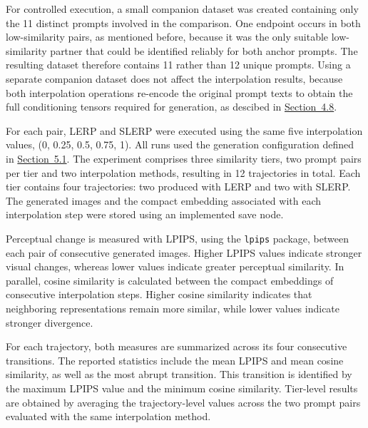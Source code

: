 For controlled execution, a small companion dataset was created containing only the 11 distinct prompts involved in the comparison. One endpoint occurs in both low-similarity pairs, as mentioned before, because it was the only suitable low-similarity partner that could be identified reliably for both anchor prompts. The resulting dataset therefore contains 11 rather than 12 unique prompts.
Using a separate companion dataset does not affect the interpolation results, because both interpolation operations re-encode the original prompt texts to obtain the full conditioning tensors required for generation, as descibed in \hyperref[sec:4.8]{Section~4.8}.

For each pair, LERP and SLERP were executed using the same five interpolation values, (0, 0.25, 0.5, 0.75, 1). All runs used the generation configuration defined in \hyperref[sec:5.1]{Section~5.1}. The experiment comprises three similarity tiers, two prompt pairs per tier and two interpolation methods, resulting in 12 trajectories in total. Each tier contains four trajectories: two produced with LERP and two with SLERP. The generated images and the compact embedding associated with each interpolation step were stored using an implemented save node.

Perceptual change is measured with LPIPS, using the \texttt{lpips} package, between each pair of consecutive generated images. Higher LPIPS values indicate stronger visual changes, whereas lower values indicate greater perceptual similarity. In parallel, cosine similarity is calculated between the compact embeddings of consecutive interpolation steps. Higher cosine similarity indicates that neighboring representations remain more similar, while lower values indicate stronger divergence.

For each trajectory, both measures are summarized across its four consecutive transitions. The reported statistics include the mean LPIPS and mean cosine similarity, as well as the most abrupt transition. This transition is identified by the maximum LPIPS value and the minimum cosine similarity. Tier-level results are obtained by averaging the trajectory-level values across the two prompt pairs evaluated with the same interpolation method.

